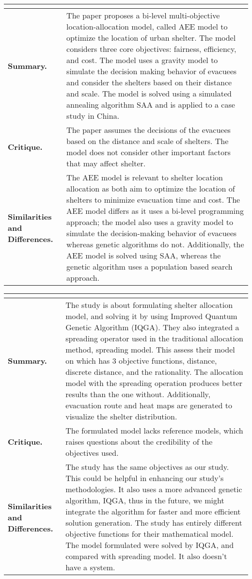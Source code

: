 \begin{longtable}{|L{.2\linewidth}|L{.74\linewidth}|}
	\hline
	\\ \hline
	\textbf{Summary.} & The paper proposes a bi-level multi-objective location-allocation model, called AEE model to optimize the location of urban shelter. The model considers three core objectives: fairness, efficiency, and cost. The model uses a gravity model to simulate the decision making behavior of evacuees and consider the shelters based on their distance and scale. The model is solved using a simulated annealing algorithm SAA and is applied to a case study in China.\\ \hline
	\textbf{Critique.} & The paper assumes the decisions of the evacuees based on the distance and scale of shelters. The model does not consider other important factors that may affect shelter.\\ \hline
	\textbf{Similarities and Differences.} & The AEE model is relevant to shelter location allocation as both aim to optimize the location of shelters to minimize evacuation time and cost.	The AEE model differs as it uses a bi-level programming approach; the model also uses a gravity model to simulate the decision-making behavior of evacuees whereas genetic algorithms do not. Additionally, the AEE model is solved using SAA, whereas the genetic algorithm uses a population based search approach. \\ \hline
\end{longtable}

\begin{longtable}{|L{.2\linewidth}|L{.74\linewidth}|}
	\hline
	\\ \hline
	\textbf{Summary.} & The study is about formulating shelter allocation model, and solving it by using Improved Quantum Genetic Algorithm (IQGA). They also integrated a spreading operator used in the traditional allocation method, spreading model. This assess their model on which has 3 objective functions, distance, discrete distance, and the rationality. The allocation model with the spreading operation produces better results than the one without. Additionally, evacuation route and heat maps are generated to visualize the shelter distribution.\\ \hline
	\textbf{Critique.} & The formulated model lacks reference models, which raises questions about the credibility of the objectives used.\\ \hline
	\textbf{Similarities and Differences.} & The study has the same objectives as our study. This could be helpful in enhancing our study's methodologies. It also uses a more advanced genetic algorithm, IQGA, thus in the future, we might integrate the algorithm for faster and more efficient solution generation. 	The study has entirely different objective functions for their mathematical model. The model formulated were solved by IQGA, and compared with spreading model. It also doesn't have a system. \\ \hline
\end{longtable}

